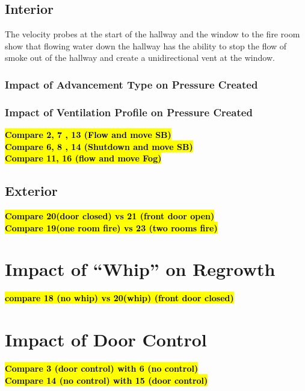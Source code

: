 \documentclass[12pt,oneside]{book}
\begin{document}
\subsection{Interior}
The velocity probes at the start of the hallway and the window to the fire room show that flowing water down the hallway has the ability to stop the flow of smoke out of the hallway and create a unidirectional vent at the window.

\subsubsection{Impact of Advancement Type on Pressure Created}

\subsubsection{Impact of Ventilation Profile on Pressure Created}
\textbf{\hl{Compare 2, 7 , 13 (Flow and move SB)}} \\
\textbf{\hl{Compare 6, 8 , 14 (Shutdown and move SB)}} \\
\textbf{\hl{Compare 11, 16 (flow and move Fog)}} \\

\subsection{Exterior}
\textbf{\hl{Compare 20(door closed) vs 21 (front door open)}} \\
\textbf{\hl{Compare 19(one room fire) vs 23 (two rooms fire)}} \\

\section{Impact of ``Whip'' on Regrowth}
\textbf{\hl{compare 18 (no whip) vs 20(whip) (front door closed)}} \\

\section{Impact of Door Control}
\textbf{\hl{Compare 3 (door control) with 6 (no control)}} \\
\textbf{\hl{Compare 14 (no control) with 15 (door control)}} \\

\normalfont
\end{document}
